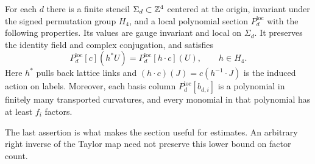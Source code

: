 

\begin{theorem}
\label{ch02:local-sections}
For each $d$ there is a finite stencil $\Sigma_d\subset\mathbb Z^4$ centered at the origin,
invariant under the signed permutation group $H_4$, and a local polynomial
section $P_d^{\mathrm{loc}}$ with the following properties.
Its values are gauge invariant and local on $\Sigma_d$. It preserves the
identity field and complex conjugation, and satisfies
\begin{equation}
 P_d^{\mathrm{loc}}[c](h^*U)=P_d^{\mathrm{loc}}[h\cdot c](U),
 \qquad h\in H_4.
 \label{ch02:section-covariance}
\end{equation}
Here $h^*$ pulls back lattice links and
$(h\cdot c)(J)=c(h^{-1}\cdot J)$ is the induced action on labels.
Moreover, each basis column $P_d^{\mathrm{loc}}[b_{d,i}]$ is a polynomial
in finitely many transported curvatures, and every monomial in that
polynomial has at least $f_i$ factors.
\end{theorem}
The last assertion is what makes the section useful for estimates. An
arbitrary right inverse of the Taylor map need not preserve this lower
bound on factor count.

